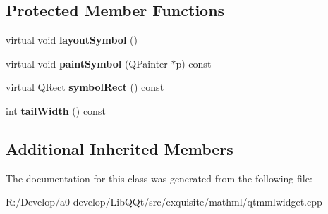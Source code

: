 \subsection*{Protected Member Functions}
\begin{DoxyCompactItemize}
\item 
\mbox{\label{class_mml_root_base_node_a0c05334dc483e73aede46282ba75359b}} 
virtual void {\bfseries layout\+Symbol} ()
\item 
\mbox{\label{class_mml_root_base_node_a13f2afc8c3b9f48872baa9778d8435b3}} 
virtual void {\bfseries paint\+Symbol} (Q\+Painter $\ast$p) const
\item 
\mbox{\label{class_mml_root_base_node_a34cfd6041d7a8a389dc9b059cefcb2de}} 
virtual Q\+Rect {\bfseries symbol\+Rect} () const
\item 
\mbox{\label{class_mml_root_base_node_a3c17cce9b0d8f88ac32f437c007e08c5}} 
int {\bfseries tail\+Width} () const
\end{DoxyCompactItemize}
\subsection*{Additional Inherited Members}


The documentation for this class was generated from the following file\+:\begin{DoxyCompactItemize}
\item 
R\+:/\+Develop/a0-\/develop/\+Lib\+Q\+Qt/src/exquisite/mathml/qtmmlwidget.\+cpp\end{DoxyCompactItemize}
